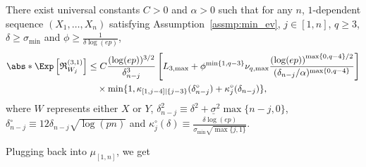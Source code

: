 \documentclass[aos]{imsart}
\begin{document}
\begin{lemma} \label{thm:remainder_lemma_3N}
    There exist universal constants $C > 0$ and $\alpha > 0$ such that for any $n$, $1$-dependent sequence $(X_1, \dots, X_n)$ satisfying Assumption~\eqref{assmp:min_ev}, $j \in [1,n]$, $q \geq 3$, $\delta \geq \sigma_{\min}$ and $\phi \geq \frac{1}{\delta \log(ep)}$,
    \begin{equation*}
    \begin{aligned}
        \abs*{\Exp \left[ \mathfrak{R}_{W_j}^{(3,1)} \right]} 
        & \leq C \frac{(\log(ep))^{3/2}}{\delta_{n-j}^3} \left[ 
            {L}_{3,\max} 
            + \phi^{\min\{1, q-3\}} \nu_{q,\max} \frac{ {(\log(ep))}^{\max\{0, q-4\}/2}}{(\delta_{n-j}/\alpha)^{\max\{0, q-4\}}}
        \right] \\
        & \quad \times \min\{ 1, \kappa_{[1,j-4]|\{j-3\}}(\delta_{n-j}^\circ) + \kappa^\circ_{j}(\delta_{n-j}) \},
    \end{aligned}
    \end{equation*}
    where $W$ represents either $X$ or $Y$, $\delta_{n-j}^2 \equiv \delta^2 + \underline{\sigma}^2 \max\{n-j,0\}$, $\delta^\circ_{n-j} \equiv 12 \delta_{n-j} \sqrt{\log(pn)}$ and $\kappa^\circ_{j}(\delta) \equiv \frac{\delta \log(ep)}{\sigma_{\min} \sqrt{\max\{j, 1\}}}$.
\end{lemma} 
Plugging back into $\mu_{[1,n]}$, we get
\end{document}
